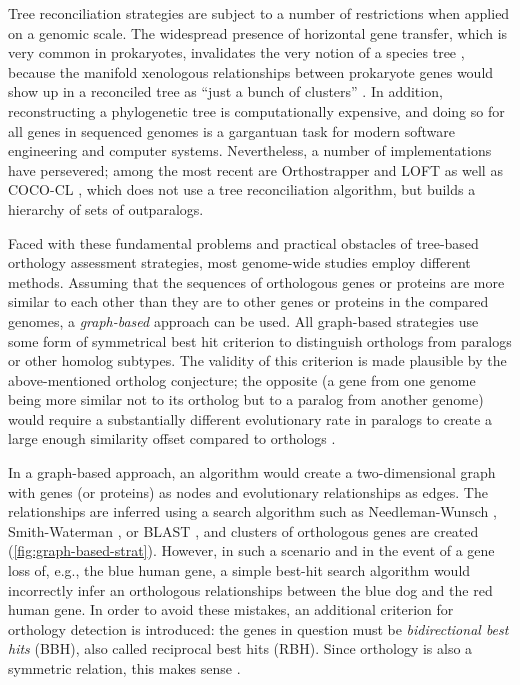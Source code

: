 Tree reconciliation strategies are subject to a number of restrictions when
applied on a genomic scale. The widespread presence of horizontal gene transfer,
which is very common in prokaryotes, invalidates the very notion of a species
tree \citep{doolittle2000}, because the manifold xenologous relationships
between prokaryote genes would show up in a reconciled tree as ``just a bunch of
clusters'' . In addition, reconstructing a phylogenetic tree is
computationally expensive, and doing so for all genes in sequenced genomes is a
gargantuan task for modern software engineering and computer systems.
Nevertheless, a number of implementations have persevered; among the most recent
are Orthostrapper \citep{jothi2006} and LOFT \citep{van_der_heijden2007} as well
as \mbox{COCO-CL} \citep{storm2002}, which does not use a tree reconciliation
algorithm, but builds a hierarchy of sets of outparalogs. 

Faced with these fundamental problems and practical obstacles of tree-based
orthology assessment strategies, most genome-wide studies employ different
methods. Assuming that the sequences of orthologous genes or proteins are more
similar to each other than they are to other genes or proteins in the compared
genomes, a \emph{graph-based} approach can be used. All graph-based strategies
use some form of symmetrical best hit criterion to distinguish orthologs from
paralogs or other homolog subtypes. The validity of this criterion is made
plausible by the above-mentioned ortholog conjecture; the opposite (a gene from
one genome being more similar not to its ortholog but to a paralog from another
genome) would require a substantially different evolutionary rate in paralogs to
create a large enough similarity offset compared to orthologs \citep{koonin2005}.



In a graph-based approach, an algorithm would create a two-dimensional graph
with genes (or proteins) as nodes and evolutionary relationships as edges. The
relationships are inferred using a search algorithm such as Needleman-Wunsch
\citeyearpar{needleman1970}, Smith-Waterman \citeyearpar{smith1981}, or BLAST
\citep{altschul1990}, and clusters of orthologous genes are created
(\autoref{fig:graph-based-strat}). However, in such a scenario and in the event
of a gene loss of, e.g., the blue human gene, a simple best-hit search algorithm
would incorrectly infer an orthologous relationships between the blue dog and
the red human gene. In order to avoid these mistakes, an additional criterion
for orthology detection is introduced: the genes in question must be
\emph{bidirectional best hits} (BBH), also called reciprocal best hits (RBH).
Since orthology is also a symmetric relation, this makes sense .

